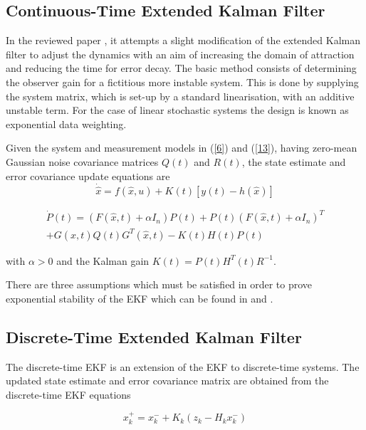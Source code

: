 \documentclass[conference]{IEEEtran}
\begin{document}
\subsection{Continuous-Time Extended Kalman Filter}
In the reviewed paper \cite{article}, it attempts a slight modification of the
extended Kalman filter to adjust the dynamics with an aim of increasing the
domain of attraction and reducing the time for error decay. The basic method
consists of determining the observer gain for a fictitious more instable
system. This is done by supplying the system matrix, which is set-up by a
standard linearisation, with an additive unstable term. For the case of linear
stochastic systems the design is known as exponential data weighting. 

Given the system and measurement models in (\ref{6}) and (\ref{13}), having
zero-mean Gaussian noise covariance matrices $Q(t)$ and $R(t)$, the state
estimate and error covariance update equations are
\begin{equation}
\dot \hat x = f(\hat x,u) + K(t)[y(t) - h(\hat x)]
\label{22}
\end{equation}

\begin{equation}
\begin{array}{l}
\dot P(t) = (F(\hat x,t) + \alpha {I_n})P(t) + P(t){(F(\hat x,t) + \alpha {I_n})^T}\\
 + G(\hat x,t)Q(t){G^T}(\hat x,t) - K(t)H(t)P(t)
\end{array}
\label{23}
\end{equation}

with $\alpha > 0$ and the Kalman gain $K(t)=P(t)H^T(t)R^{-1}$.

There are three assumptions which must be satisfied in order to prove
exponential stability of the EKF which can be found in \cite{article}
and \cite{ar}.


\subsection{Discrete-Time Extended Kalman Filter}

The discrete-time EKF is an extension of the EKF to discrete-time systems. The
updated state estimate and error covariance matrix are obtained from the discrete-time EKF equations

\begin{equation}
x_k^ +  = x_k^ -  + {K_k}({z_k} - {H_k}x_k^ - )
\label{37}
\end{equation}
\end{document}
